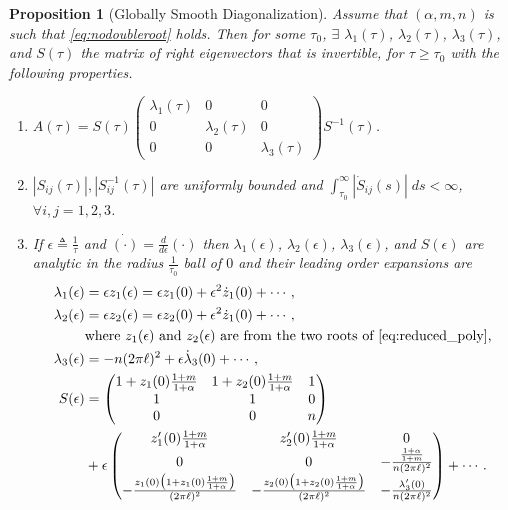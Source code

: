\documentclass[a4paper,11pt]{article}
\def\l{(2\pi \ell)}
\newtheorem{proposition}{Proposition}[section]
\theoremstyle{remark}
\begin{document}
\begin{proposition}[Globally Smooth Diagonalization] \label{prop:ctsdiag}
 Assume that $(\alpha,m,n)$ is such that \eqref{eq:nodoubleroot} holds. Then for some $\tau_0$, $\exists$ $\lambda_1(\tau)$, $\lambda_2(\tau)$, $\lambda_3(\tau)$, and $S(\tau)$ the matrix of right eigenvectors that is invertible, for $\tau\ge\tau_0$  with the following properties.
 \begin{enumerate}
  \item $A(\tau) = S(\tau) \begin{pmatrix} \lambda_1(\tau) & 0 & 0\\ 0 & \lambda_2(\tau) & 0 \\ 0 & 0 & \lambda_3(\tau) \end{pmatrix} S^{-1}(\tau)$.%
  \item $|S_{ij}(\tau)|, |S^{-1}_{ij}(\tau)|$ are uniformly bounded and %
  $\int_{\tau_0}^\infty |\dot{S}_{ij}(s)|\; ds <\infty$, $\forall i,j=1,2,3$.
  \item If $\epsilon\triangleq \frac{1}{\tau}$ and $\dot{(\cdot)}=\frac{d}{d\epsilon}(\cdot)$ then $\lambda_1(\epsilon)$, $\lambda_2(\epsilon)$, $\lambda_3(\epsilon)$, and $S(\epsilon)$ are analytic in the radius $\frac{1}{\tau_0}$ ball of $0$ and their leading order expansions are
  \begin{align}
   \lambda_1(\epsilon) &= \epsilon z_1(\epsilon) = \epsilon z_1(0) + \epsilon^2 \dot z_1(0) + \cdots,\nonumber\\
   \lambda_2(\epsilon) &= \epsilon z_2(\epsilon) =\epsilon z_2(0) + \epsilon^2 \dot z_1(0) + \cdots,\nonumber\\ &\text{where $z_1(\epsilon)$ and $z_2(\epsilon)$ are from the two roots of \eqref{eq:reduced_poly},}\nonumber \\
   \lambda_3(\epsilon) &= -n\l^2 + \epsilon\dot\lambda_3(0) + \cdots, \nonumber\\
   S(\epsilon)
   &=\begin{pmatrix}
    1 + z_1(0)\frac{1+m}{1+\alpha} & 1 + z_2(0)\frac{1+m}{1+\alpha} & 1 \nonumber\\
    1 & 1 & 0\\
    0 & 0 & n
   \end{pmatrix} \\&+ \epsilon
   \begin{pmatrix}
    z_1'(0)\frac{1+m}{1+\alpha} & z_2'(0)\frac{1+m}{1+\alpha} & 0 \nonumber\\
    0 & 0 & -\frac{\frac{1+\alpha}{1+m}}{n\l^2}\\
    -\frac{z_1(0)\big(1+z_1(0)\frac{1+m}{1+\alpha}\big)}{\l^2} & -\frac{z_2(0)\big(1+z_2(0)\frac{1+m}{1+\alpha}\big)}{\l^2} & -\frac{\lambda_3'(0)}{n\l^2} \nonumber\\
   \end{pmatrix} + \cdots.
  \end{align}
 \end{enumerate}
\end{proposition}
\end{document}
